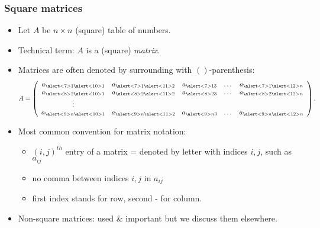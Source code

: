 \begin{frame}
\frametitle{Square matrices}
\begin{itemize}
\item Let $A$ be $n\times n$ (square) table of numbers.
\item<2-> Technical term: $A$ is a (square) \emph{matrix}. 
\item<3-> Matrices are often denoted by surrounding with $\left(\right)$-parenthesis:
\[
A=\left(
\begin{array}{ccccc}
a_{\alert<7>{1}\alert<10>{1}} & a_{\alert<7>{1}\alert<11>{2}} & a_{\alert<7>{1}3}& \dots & a_{\alert<7>{1}\alert<12>{n}}\\
a_{\alert<8>{2}\alert<10>{1}} & a_{\alert<8>{2}\alert<11>{2}} & a_{\alert<8>{2}3}& \dots & a_{\alert<8>{2}\alert<12>{n}}\\
\vdots \\
a_{\alert<9>{n}\alert<10>{1}} & a_{\alert<9>{n}\alert<11>{2}} & a_{\alert<9>{n}3}& \dots & a_{\alert<9>{n}\alert<12>{n}}
\end{array}
\right).
\] 

\item<4-> Most common convention for matrix notation: 
\begin{itemize}
\item $(i,j)^{th}$ entry of a matrix = denoted by letter with indices $i,j$, such as $a_{ij}$
\item<5-> no comma between indices $i,j$ in $a_{ij}$
\item<6-> first index stands for row, second - for column. 
\end{itemize}
\item<13-> Non-square matrices: used \& important but we discuss them elsewhere.
\end{itemize}
\end{frame}



